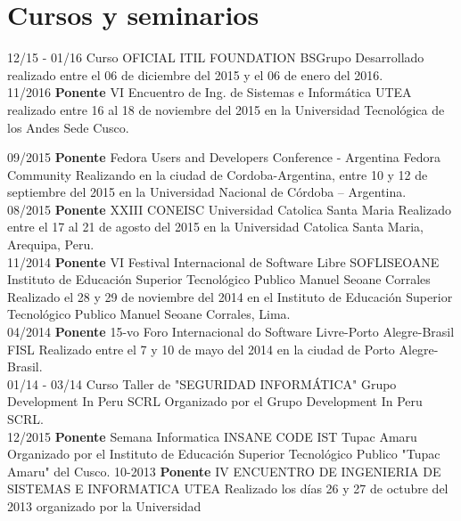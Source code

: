 \documentclass[]{friggeri-cv}
\begin{document}
\section{Cursos y seminarios}
\begin{entrylist}
    \entry
    {12/15 - 01/16}
    {Curso OFICIAL ITIL FOUNDATION}
    {BSGrupo}
    {Desarrollado realizado entre el 06 de diciembre del 2015 y el 06 de enero del 2016.\\}
    \entry
    {11/2016}
    {\textbf{Ponente} VI Encuentro de Ing. de Sistemas e Inform\'atica }
    {UTEA}
    {realizado entre 16 al 18 de noviembre del 2015 en la Universidad Tecnol\'ogica
    de los Andes Sede Cusco.\\}
\end{entrylist}
\begin{entrylist}
    \entry
    {09/2015}
    {\textbf{Ponente} Fedora Users and Developers Conference - Argentina}
    {Fedora Community}
    {Realizando en la ciudad de Cordoba-Argentina, entre 10 y 12 de septiembre
    del 2015 en la Universidad Nacional de C\'ordoba – Argentina.\\}
    \entry
    {08/2015}
    {\textbf{Ponente} {XXIII CONEISC}}
    {Universidad Catolica Santa Maria}
    {Realizado entre el 17 al 21 de agosto del 2015 en la Universidad Catolica Santa Maria, Arequipa, Peru.\\}
    \entry
    {11/2014}
    {\textbf{Ponente} VI Festival Internacional de Software Libre SOFLISEOANE}
    {Instituto de Educaci\'on Superior Tecnol\'ogico Publico Manuel Seoane Corrales}
    {Realizado el 28 y 29 de noviembre del 2014 en el Instituto de Educaci\'on Superior
    Tecnol\'ogico Publico Manuel Seoane Corrales, Lima.\\}
    \entry
    {04/2014}
    {\textbf{Ponente} 15-vo Foro Internacional do Software Livre-Porto Alegre-Brasil}
    {FISL}
    {Realizado entre el 7 y 10 de mayo del 2014 en la ciudad de Porto Alegre-Brasil.\\}
    \entry
    {01/14 - 03/14}
    {Curso Taller de "SEGURIDAD INFORM\'ATICA"}
    {Grupo Development In Peru SCRL}
    {Organizado por el Grupo Development In Peru SCRL.\\}
    \entry
    {12/2015}
    {\textbf{Ponente} Semana Informatica INSANE CODE}
    {IST Tupac Amaru}
    {Organizado por el Instituto de Educaci\'on Superior Tecnol\'ogico Publico "Tupac
    Amaru" del Cusco.}
    \entry
    {10-2013}
    {\textbf{Ponente} IV ENCUENTRO DE INGENIERIA DE SISTEMAS E INFORMATICA}
    {UTEA}
    {Realizado los d\'ias 26 y 27 de octubre del 2013 organizado por la Universidad
}
\end{entrylist}
\end{document}
